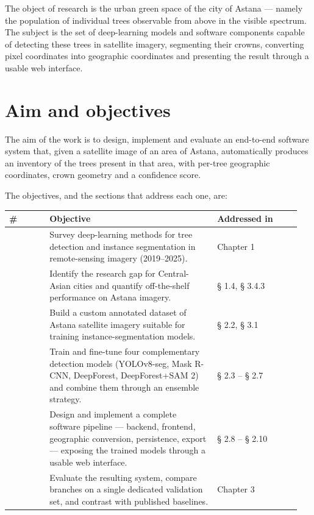 The object of research is the urban green space of the city of Astana --- namely the population of individual trees observable from above in the visible spectrum. The subject is the set of deep-learning models and software components capable of detecting these trees in satellite imagery, segmenting their crowns, converting pixel coordinates into geographic coordinates and presenting the result through a usable web interface.

\section{Aim and objectives}\label{aim-and-objectives}

The aim of the work is to design, implement and evaluate an end-to-end software system that, given a satellite image of an area of Astana, automatically produces an inventory of the trees present in that area, with per-tree geographic coordinates, crown geometry and a confidence score.

The objectives, and the sections that address each one, are:

{\def\LTcaptype{none} %
\begin{longtable}[]{@{}>{\raggedright\arraybackslash}p{0.139\linewidth} >{\raggedright\arraybackslash}p{0.54\linewidth} >{\raggedright\arraybackslash}p{0.27\linewidth}@{}}
\toprule\noalign{}
\textbf{\#} & \textbf{Objective} & \textbf{Addressed in} \\
\midrule\noalign{}
\endhead
\bottomrule\noalign{}
\endlastfoot
1 & Survey deep-learning methods for tree detection and instance segmentation in remote-sensing imagery (2019--2025). & Chapter 1 \\
2 & Identify the research gap for Central-Asian cities and quantify off-the-shelf performance on Astana imagery. & § 1.4, § 3.4.3 \\
3 & Build a custom annotated dataset of Astana satellite imagery suitable for training instance-segmentation models. & § 2.2, § 3.1 \\
4 & Train and fine-tune four complementary detection models (YOLOv8-seg, Mask R-CNN, DeepForest, DeepForest+SAM 2) and combine them through an ensemble strategy. & § 2.3 -- § 2.7 \\
5 & Design and implement a complete software pipeline --- backend, frontend, geographic conversion, persistence, export --- exposing the trained models through a usable web interface. & § 2.8 -- § 2.10 \\
6 & Evaluate the resulting system, compare branches on a single dedicated validation set, and contrast with published baselines. & Chapter 3 \\
\end{longtable}
}

